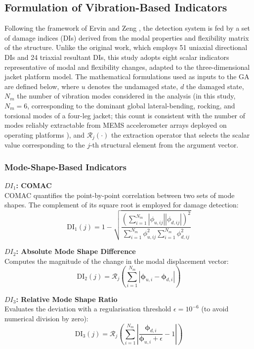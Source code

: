 \documentclass[preprint,12pt]{elsarticle}
\begin{document}
\subsection{Formulation of Vibration-Based Indicators}
Following the framework of Ervin and Zeng \citep{ervin2022index}, the detection system is fed by a set of damage indices (DIs) derived from the modal properties and flexibility matrix of the structure. Unlike the original work, which employs 51 uniaxial directional DIs and 24 triaxial resultant DIs, this study adopts eight scalar indicators representative of modal and flexibility changes, adapted to the three-dimensional jacket platform model. The mathematical formulations used as inputs to the GA are defined below, where $u$ denotes the undamaged state, $d$ the damaged state, $N_m$ the number of vibration modes considered in the analysis (in this study, $N_m = 6$, corresponding to the dominant global lateral-bending, rocking, and torsional modes of a four-leg jacket; this count is consistent with the number of modes reliably extractable from MEMS accelerometer arrays deployed on operating platforms \citep{ghsoub2018structural}), and $\mathcal{R}_j(\cdot)$ the extraction operator that selects the scalar value corresponding to the $j$-th structural element from the argument vector.

\subsubsection{Mode-Shape-Based Indicators}
\textbf{$DI_1$: COMAC} \\
COMAC quantifies the point-by-point correlation between two sets of mode shapes. The complement of its square root is employed for damage detection:
\begin{equation}
    \text{DI}_1(j) = 1 - \sqrt{ \frac{ \left( \sum_{i=1}^{N_m} |\phi_{u,ij}| |\phi_{d,ij}| \right)^2 }{ \sum_{i=1}^{N_m} \phi_{u,ij}^2 \sum_{i=1}^{N_m} \phi_{d,ij}^2 } }
\end{equation}

\textbf{$DI_2$: Absolute Mode Shape Difference} \\
Computes the magnitude of the change in the modal displacement vector:
\begin{equation}
    \text{DI}_2(j) = \mathcal{R}_j \left( \sum_{i=1}^{N_m} | \boldsymbol{\phi}_{u,i} - \boldsymbol{\phi}_{d,i} | \right)
\end{equation}

\textbf{$DI_3$: Relative Mode Shape Ratio} \\
Evaluates the deviation with a regularisation threshold $\epsilon = 10^{-6}$ (to avoid numerical division by zero):
\begin{equation}
    \text{DI}_3(j) = \mathcal{R}_j \left( \sum_{i=1}^{N_m} \left| \frac{\boldsymbol{\phi}_{d,i}}{\boldsymbol{\phi}_{u,i} + \epsilon} - 1 \right| \right)
\end{equation}
\end{document}
